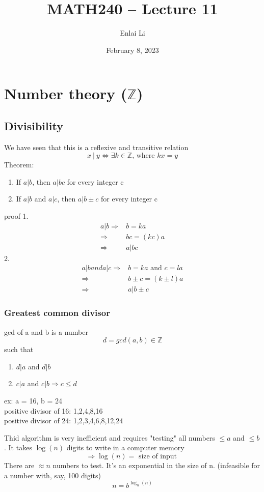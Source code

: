 \documentclass{article}
\author{Enlai Li}
\title{MATH240 -- Lecture 11}
\date{February 8, 2023}
\begin{document}
\maketitle
\section{Number theory ($\mathbb{Z} $)}
\subsection{Divisibility}
We have seen that this is a reflexive and transitive relation
\[
    x \ \vert \ y \iff \exists k \in \mathbb{Z} \text{, where } kx=y
\]
Theorem:
\begin{enumerate}
    \item If $a|b$, then $a|bc$ for every integer c
    \item If $a|b$ and $a|c$, then $a|b \pm c$ for every integer c
\end{enumerate}
proof
1.
\begin{align*}
    a|b
    \Rightarrow & b = ka     \\
    \Rightarrow & bc = (kc)a \\
    \Rightarrow & a|bc
\end{align*}
2.
\begin{align*}
    a|b and a|c
    \Rightarrow & b=ka \text{ and } c = la \\
    \Rightarrow & b \pm c = (k \pm l)a     \\
    \Rightarrow & a|b \pm c
\end{align*}

\subsubsection{Greatest common divisor}
gcd of a and b is a number \[
    d = gcd(a,b) \in \mathbb{Z}
\]
such that
\begin{enumerate}
    \item $d|a$ and $d|b$ 
    \item $c|a$ and $c|b \Rightarrow c \le d$ 
\end{enumerate}
ex: a = 16, b = 24
\\ positive divisor of 16: 1,2,4,8,16
\\ positive divisor of 24: 1,2,3,4,6,8,12,24

Thid algorithm is very inefficient and requires "testing" all numbers $\le a$ and $\le b$. It takes $\log(n)$ digits to write in a computer memory
\[
    \Rightarrow \log(n) = \text{ size of input }
\]
There are $\approx n$ numbers to test. It's an exponential in the size of n. (infeasible for a number with, say, 100 digits) \[
    n = b ^{\log_n(n)}
\]
\end{document}
